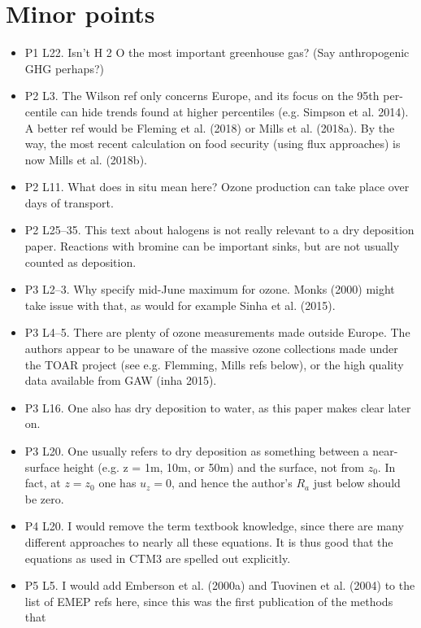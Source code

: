 \documentclass{scrartcl}
\begin{document}
\section{Minor points}
\begin{itemize}
\item {\color{blue}P1 L22. Isn’t H 2 O the most important greenhouse gas? (Say anthropogenic
GHG perhaps?)}
\item {\color{blue}P2 L3. The Wilson ref only concerns Europe, and its focus on the 95th per-
centile can hide trends found at higher percentiles (e.g. Simpson et al. 2014). A
better ref would be Fleming et al. (2018) or Mills et al. (2018a). By the way,
the most recent calculation on food security (using flux approaches) is now Mills
et al. (2018b).}
\item {\color{blue}P2 L11. What does in situ mean here? Ozone production can take place over
days of transport.}
\item {\color{blue}P2 L25--35. This text about halogens is not really relevant to a dry deposition
paper. Reactions with bromine can be important sinks, but are not usually counted
as deposition.}
\item {\color{blue}P3 L2--3. Why specify mid-June maximum for ozone. Monks (2000) might
take issue with that, as would for example Sinha et al. (2015).}
\item {\color{blue}P3 L4--5. There are plenty of ozone measurements made outside Europe. The
authors appear to be unaware of the massive ozone collections made under the
TOAR project (see e.g. Flemming, Mills refs below), or the high quality data
available from GAW (inha 2015).}
\item {\color{blue}P3 L16. One also has dry deposition to water, as this paper makes clear later
on.}
\item {\color{blue}P3 L20. One usually refers to dry deposition as something between a near-
surface height (e.g. z = 1m, 10m, or 50m) and the surface, not from $z_0$. In fact,
at $z = z_0$ one has $u_z = 0$, and hence the author’s $R_a$ just below should be zero.}
\item {\color{blue}P4 L20. I would remove the term textbook knowledge, since there are many
different approaches to nearly all these equations. It is thus good that the equations
as used in CTM3 are spelled out explicitly.}
\item {\color{blue}P5 L5. I would add Emberson et al. (2000a) and Tuovinen et al. (2004) to
the list of EMEP refs here, since this was the first publication of the methods that
}
\end{itemize}
\end{document}
